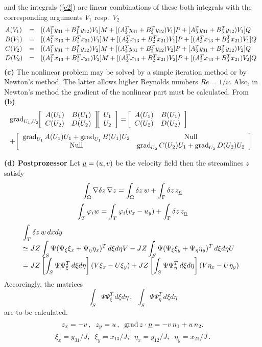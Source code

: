 \documentclass[12pt,a4paper,USenglish,twoside]{book}
\begin{document}
and the integrals (\ref{e2}) are linear combinations of these both integrals with the 
corresponding arguments $V_1$ resp.\ $V_2$
\[
\ba{.}{lll}
A(V_1) &=& [(A^T_1y_{31} + B^T_1y_{12})V_1]M + [(A^T_2y_{31} + B^T_2y_{12})V_1]P
+ [A^T_3y_{31} + B^T_3y_{12})V_1]Q\\[0.5ex]
%
B(V_1) &=& [(A^T_1x_{13} + B^T_1x_{21})V_1]M + [(A^T_2x_{13} + B^T_2x_{21})V_1]P
+ [(A^T_3x_{13} + B^T_3x_{21})V_1]Q\\[0.5ex]
%
C(V_2) &=& [(A^T_1y_{31} + B^T_1y_{12})V_2]M + [(A^T_2y_{31} + B^T_2y_{12})V_2]P
+ [A^T_3y_{31} + B^T_3y_{12})V_2]Q\\[0.5ex]
%
D(V_2) &=& [(A^T_1x_{13} + B^T_1x_{21})V_2]M + [(A^T_2x_{13} + B^T_2x_{21})V_2]P
+ [(A^T_3x_{13} + B^T_3x_{21})V_2]Q
\ea{.}
\]
{\bf(c)}
The nonlinear problem may be solved by a simple iteration method or by {\sc Newton}'s 
method. The latter allows higher {\sc Reynolds} numbers $Re = 1/\nu$. Also, in {\sc 
Newton}'s method the gradient of the nonlinear part must be calculated. From {\bf (b)}
\[
\ba{.}{l}
\grad_{U_1,U_2}
\, \ba{[}{rr} A(U_1) & B(U_1)\\ C(U_2) & D(U_2)\ea{]}
\ba{[}{r}U_1\\ U_2\ea{]}
= \ \ba{[}{rr} A(U_1) & B(U_1)\\ C(U_2) & D(U_2)\ea{]}
\\[3ex]
 + \ \ba{[}{cc} \grad_{U_1}A(U_1)U_1 + \grad_{U_1}B(U_1)U_2 & \text{Null} \\ 
     \text{Null} & \grad_{U_2}C(U_2)U_1 + \grad_{U_2}D(U_2)U_2\ea{]}
\ea{.}     
\]
\par
{\bf (d) Postprozessor}
Let $\u = (u,v)$ be the velocity field then the streamlines $z$ satisfy
%
\[
\int _{\Omega}\nabla \delta z\, \nabla z
= \int_{\Omega}\delta z\, w  + \int_{\Gamma}\delta z \, z_{\n}
\]
\[
\int_T\phi_iw = \int_T\phi_i(v_x - u_y) + \int_{\Gamma}\delta z \, z_{\n}
\]
\[
\ba{.}{l}
\dis \int_T\delta z\, w \,dxdy\\[1ex]
\simeq \dis
JZ\int_S\Psi(\Psi_{\xi}\xi_x + \Psi_{\eta}\eta_x)^T\,d\xi d\eta V
- JZ \int_S\Psi(\Psi_{\xi}\xi_y + \Psi_{\eta}\eta_y)^T\,d\xi d\eta U\\[1ex]
= \dis
JZ \left[\int_S\Psi\Psi_{\xi}^T\,d\xi d\eta\right](V\xi_x - U\xi_y)
+
JZ\left[\int_S\Psi\Psi_{\eta}^T\,d\xi d\eta\right](V\eta_x - U\eta_y)
\ea{.}
\]
Accorcingly, the matrices
\[
\int_S\Psi\Psi_{\xi}^T\,d\xi d\eta\,,\;\;
\int_S\Psi\Psi_{\eta}^T\,d\xi d\eta
\]
are to be calculated.
%
\[
z_x = - v\,,\;\; z_y = u\,,\;\; \grad z\cdot \n = -v\,n_1 + u\,n_2.
\]
%
\[
\xi _x = y_{31}/J, \;\; \xi _y = x_{13}/J, \;\;
\eta _x = y_{12}/J, \;\; \eta _y = x_{21}/J\,.
\]
\end{document}
